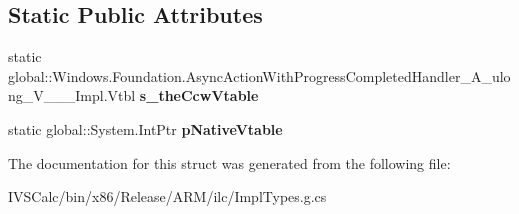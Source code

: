 \subsection*{Static Public Attributes}
\begin{DoxyCompactItemize}
\item 
\mbox{\label{struct_windows_1_1_foundation_1_1_async_action_with_progress_completed_handler___a__ulong___v_______impl_1_1_vtbl_a92dd0fc0042ccbcb24fa2fed278d8ad9}} 
static global\+::\+Windows.\+Foundation.\+Async\+Action\+With\+Progress\+Completed\+Handler\+\_\+\+A\+\_\+ulong\+\_\+\+V\+\_\+\+\_\+\+\_\+\+Impl.\+Vtbl {\bfseries s\+\_\+the\+Ccw\+Vtable}
\item 
\mbox{\label{struct_windows_1_1_foundation_1_1_async_action_with_progress_completed_handler___a__ulong___v_______impl_1_1_vtbl_abdb328b3a1e017c8b5337a0121b73e36}} 
static global\+::\+System.\+Int\+Ptr {\bfseries p\+Native\+Vtable}
\end{DoxyCompactItemize}


The documentation for this struct was generated from the following file\+:\begin{DoxyCompactItemize}
\item 
I\+V\+S\+Calc/bin/x86/\+Release/\+A\+R\+M/ilc/Impl\+Types.\+g.\+cs\end{DoxyCompactItemize}
